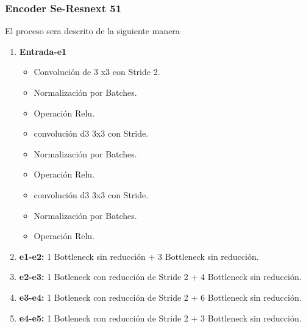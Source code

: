 \subsubsection{ Encoder Se-Resnext 51}
El proceso sera descrito de la siguiente manera 
\begin{enumerate}
    \item \textbf{Entrada-e1}  
       \begin{itemize}
        \item Convolución de 3 x3  con \gls{Stride} 2.
           \item    Normalización por \gls{Batch}es.
            \item    Operación \gls{Relu}.
            \item    convolución d3 3x3 con \gls{Stride}.
           \item    Normalización por \gls{Batch}es.
            \item    Operación \gls{Relu}.
            \item    convolución d3 3x3 con \gls{Stride}.
           \item    Normalización por \gls{Batch}es.
            \item    Operación \gls{Relu}.
            
            
            
            
            
       \end{itemize}{}
    \item \textbf{e1-e2:} 1 Bottleneck sin reducción + 3 Bottleneck  sin reducción. 
     \item \textbf{e2-e3:} 1 Botleneck con reducción de Stride 2 + 4 Bottleneck sin reducción. 
     
    \item \textbf{e3-e4:} 1 Botleneck con reducción de Stride 2 + 6 Bottleneck sin reducción.
    \item \textbf{e4-e5:} 1 Botleneck con reducción de Stride 2 + 3 Bottleneck sin reducción.

\end{enumerate}{}
